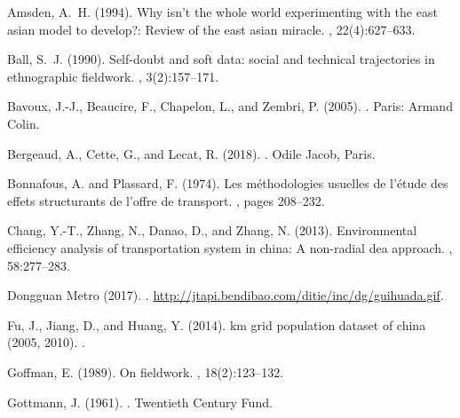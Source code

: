 \begin{thebibliography}{}

Amsden, A.~H. (1994).
\newblock Why isn't the whole world experimenting with the east asian model to
  develop?: Review of the east asian miracle.
, 22(4):627--633.

Ball, S.~J. (1990).
\newblock Self-doubt and soft data: social and technical trajectories in
  ethnographic fieldwork.
,
  3(2):157--171.

Bavoux, J.-J., Beaucire, F., Chapelon, L., and Zembri, P. (2005).
.
\newblock Paris: Armand Colin.

Bergeaud, A., Cette, G., and Lecat, R. (2018).
.
\newblock Odile Jacob, Paris.

Bonnafous, A. and Plassard, F. (1974).
\newblock Les m{\'e}thodologies usuelles de l'{\'e}tude des effets structurants
  de l'offre de transport.
, pages 208--232.

Chang, Y.-T., Zhang, N., Danao, D., and Zhang, N. (2013).
\newblock Environmental efficiency analysis of transportation system in china:
  A non-radial dea approach.
, 58:277--283.

{Dongguan Metro} (2017).
.
\newblock \url{http://jtapi.bendibao.com/ditie/inc/dg/guihuada.gif}.

Fu, J., Jiang, D., and Huang, Y. (2014).
 km grid population dataset of china (2005, 2010).
.

Goffman, E. (1989).
\newblock On fieldwork.
, 18(2):123--132.

Gottmann, J. (1961).
.
\newblock Twentieth Century Fund.


\end{thebibliography}
